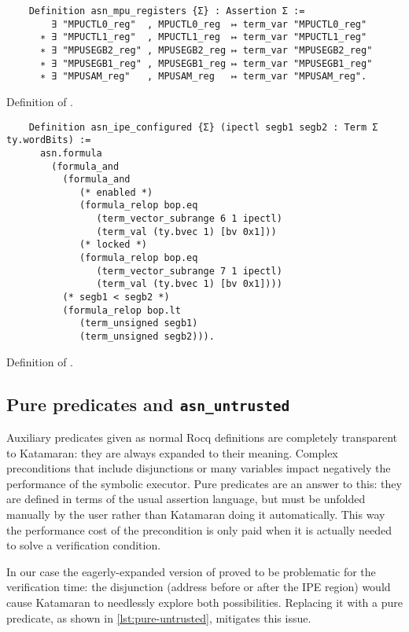 \begin{listing}
  \begin{verbatim}
    Definition asn_mpu_registers {Σ} : Assertion Σ :=
        ∃ "MPUCTL0_reg"  , MPUCTL0_reg  ↦ term_var "MPUCTL0_reg"
      ∗ ∃ "MPUCTL1_reg"  , MPUCTL1_reg  ↦ term_var "MPUCTL1_reg"
      ∗ ∃ "MPUSEGB2_reg" , MPUSEGB2_reg ↦ term_var "MPUSEGB2_reg"
      ∗ ∃ "MPUSEGB1_reg" , MPUSEGB1_reg ↦ term_var "MPUSEGB1_reg"
      ∗ ∃ "MPUSAM_reg"   , MPUSAM_reg   ↦ term_var "MPUSAM_reg".
  \end{verbatim}
  \caption{Definition of .}
  \label{lst:asn_mpu_registers}
\end{listing}

\begin{listing}
  \begin{verbatim}
    Definition asn_ipe_configured {Σ} (ipectl segb1 segb2 : Term Σ ty.wordBits) :=
      asn.formula
        (formula_and
          (formula_and
             (* enabled *)
             (formula_relop bop.eq
                (term_vector_subrange 6 1 ipectl)
                (term_val (ty.bvec 1) [bv 0x1]))
             (* locked *)
             (formula_relop bop.eq
                (term_vector_subrange 7 1 ipectl)
                (term_val (ty.bvec 1) [bv 0x1])))
          (* segb1 < segb2 *)
          (formula_relop bop.lt
             (term_unsigned segb1)
             (term_unsigned segb2))).
  \end{verbatim}
  \caption{Definition of .}
  \label{lst:asn_ipe_configured}
\end{listing}

\subsection{Pure predicates and \texttt{asn\_untrusted}}

Auxiliary predicates given as normal Rocq definitions are completely transparent to Katamaran: they are always expanded to their meaning. Complex preconditions that include disjunctions or many variables impact negatively the performance of the symbolic executor. Pure predicates are an answer to this: they are defined in terms of the usual assertion language, but must be unfolded manually by the user rather than Katamaran doing it automatically. This way the performance cost of the precondition is only paid when it is actually needed to solve a verification condition.

In our case the eagerly-expanded version of  proved to be problematic for the verification time: the disjunction (address before or after the IPE region) would cause Katamaran to needlessly explore both possibilities. Replacing it with a pure predicate, as shown in \cref{lst:pure-untrusted}, mitigates this issue.

